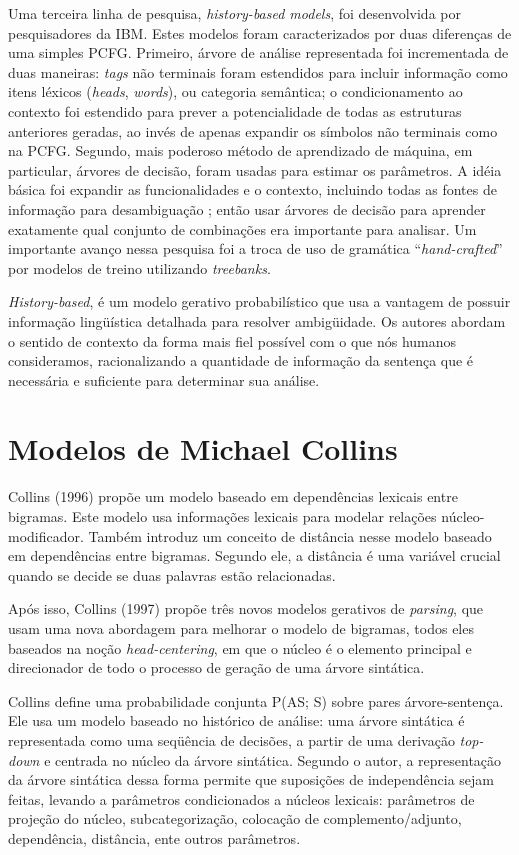 Uma terceira linha de pesquisa, \emph{history-based models}, foi desenvolvida por pesquisadores da IBM. Estes modelos foram caracterizados por duas diferenças de uma simples PCFG. Primeiro, árvore de análise representada foi incrementada de duas maneiras: \emph{tags} não terminais foram estendidos para incluir informação como itens léxicos (\emph{heads}, \emph{words}), ou categoria semântica; o condicionamento ao contexto foi estendido para prever a potencialidade de todas as estruturas anteriores geradas, ao invés de apenas expandir os símbolos não terminais como na PCFG.
Segundo, mais poderoso método de aprendizado de máquina, em particular, árvores de decisão, foram usadas para estimar os parâmetros. A idéia básica foi expandir as funcionalidades e o contexto, incluindo todas as fontes de informação para desambiguação ; então usar árvores de decisão para aprender exatamente qual conjunto de combinações era importante para analisar.
Um importante avanço nessa pesquisa foi a troca de uso de gramática ``\emph{hand-crafted}''  por modelos de treino utilizando \emph{treebanks}.

\emph{History-based}, é um modelo gerativo probabilístico que usa a vantagem de possuir informação lingüística detalhada para resolver ambigüidade. Os autores abordam o sentido de contexto da forma mais fiel possível com o que nós humanos consideramos, racionalizando a quantidade de informação da sentença
que é necessária e suficiente para determinar sua análise.


\section{Modelos de Michael Collins}
\label{sec:modelos_collins}

Collins (1996) propõe um modelo baseado em dependências lexicais entre bigramas. Este modelo usa informações lexicais para modelar relações núcleo-modificador. Também introduz um conceito de distância nesse modelo baseado em dependências entre bigramas. Segundo ele, a distância é uma variável crucial quando se decide se duas palavras estão relacionadas.

Após isso, Collins (1997) propõe três novos modelos gerativos de \emph{parsing}, que usam uma nova abordagem para melhorar o modelo de bigramas, todos eles baseados na noção \emph{head-centering}, em que o núcleo é o elemento principal e direcionador de todo o processo de geração de uma árvore sintática.

Collins define uma probabilidade conjunta P(AS; S) sobre pares árvore-sentença. Ele usa um modelo baseado no histórico de análise: uma árvore sintática é representada como uma seqüência de decisões, a partir de uma derivação \emph{top-down} e centrada no núcleo da árvore sintática. Segundo o autor, a representação da árvore sintática dessa forma permite que suposições de independência sejam feitas, levando a parâmetros condicionados a núcleos lexicais: parâmetros de projeção do núcleo, subcategorização, colocação de complemento/adjunto, dependência, distância, ente outros parâmetros.

